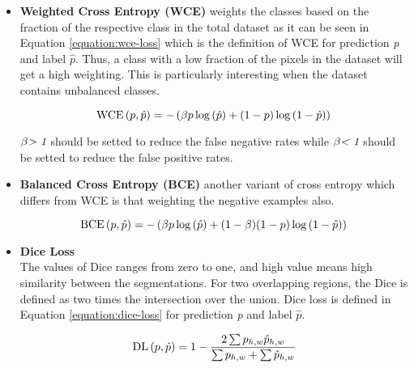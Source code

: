         \begin{itemize}

            \item \textbf{Weighted Cross Entropy (WCE)} weights the classes based on the fraction of the respective class in the total dataset as it can be seen in Equation \eqref{equation:wce-loss} which is the definition of WCE for prediction \emph{p} and label $\hat{p}$.
                    Thus, a class with a low fraction of the pixels in the dataset will get a high weighting. This is particularly interesting when the dataset contains unbalanced classes.

                    \begin{equation}
                        \text{WCE}\left(p, \hat{p}\right) = -\left(\beta p \log\left(\hat{p}\right) + (1-p) \log\left(1 - \hat{p}\right)\right) \label{equation:wce-loss} \\
                    \end{equation}

                    $\beta \emph{> 1}$ should be setted to reduce the false negative rates while $\beta \emph{< 1}$ should be setted to reduce the false positive rates.

            \item \textbf{Balanced Cross Entropy (BCE)} another variant of cross entropy which differs from WCE is that weighting the negative examples also.

                    \begin{equation}
                        \text{BCE}\left(p, \hat{p}\right) = -\left(\beta p \log\left(\hat{p}\right) + (1 - \beta)(1-p) \log\left(1 - \hat{p}\right)\right) \label{equation:bce-loss} \\
                    \end{equation}

            \item \textbf{Dice Loss}\\

                    The values of Dice ranges from zero to one, and high value means high similarity between the segmentations.
                    For two overlapping regions, the Dice is defined as two times the intersection over the union.
                    Dice loss is defined in Equation \eqref{equation:dice-loss} for prediction \emph{p} and label $\hat{p}$.

                    \begin{equation}
                        \text{DL}\left(p, \hat{p}\right) = 1 - \frac{2\sum p_{h,w}\hat{p}_{h,w}}{\sum p_{h,w} + \sum \hat{p}_{h,w}} \label{equation:dice-loss} \\
                    \end{equation}

        \end{itemize}

